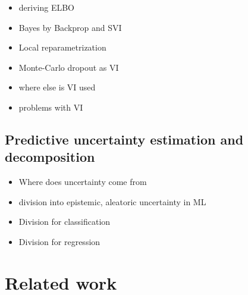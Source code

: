 \begin{itemize}
	\item deriving ELBO
	\item Bayes by Backprop and SVI
	\item Local reparametrization
	\item Monte-Carlo dropout as VI
	\item where else is VI used
	\item problems with VI
\end{itemize}


\subsection{Predictive uncertainty estimation and decomposition}

\begin{itemize}
	\item Where does uncertainty come from
	\item division into epistemic, aleatoric uncertainty in ML
	\item Division for classification
	\item Division for regression 
	
\end{itemize}

\section{Related work}


